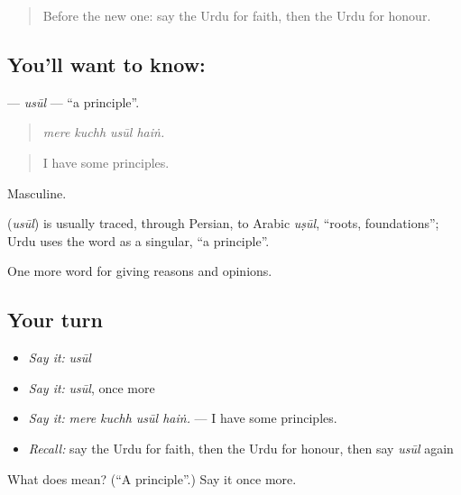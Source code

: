 \begin{quote}
Before the new one: say the Urdu for faith, then the Urdu for honour.
\end{quote}

\subsection*{You'll want to know: }
\textbf{} — \emph{usūl} — \textquotedblleft{}a principle\textquotedblright{}.

\begin{quote}
   
\end{quote}

\begin{quote}
\emph{mere kuchh usūl haiṅ.}
\end{quote}

\begin{quote}
I have some principles.
\end{quote}

Masculine.

\begin{cousinweb}
\textbf{} (\emph{usūl}) is usually traced, through Persian, to Arabic \emph{uṣūl}, \textquotedblleft{}roots, foundations\textquotedblright{}; Urdu uses the word as a singular, \textquotedblleft{}a principle\textquotedblright{}.
\end{cousinweb}

\begin{grammarlens}[title={What you've built}]
One more word for giving reasons and opinions.
\end{grammarlens}

\subsection*{Your turn}
\begin{itemize}
\raggedright
  \item \emph{Say it:} \emph{usūl}
  \item \emph{Say it:} \emph{usūl}, once more
  \item \emph{Say it:} \emph{mere kuchh usūl haiṅ.} — I have some principles.
  \item \emph{Recall:} say the Urdu for faith, then the Urdu for honour, then say \emph{usūl} again
\end{itemize}

\begin{tcolorbox}[breakable,colback=teal!4,colframe=teal!35!black,title={Before you move on}]
What does  mean? (\textquotedblleft{}A principle\textquotedblright{}.) Say it once more.
\end{tcolorbox}
